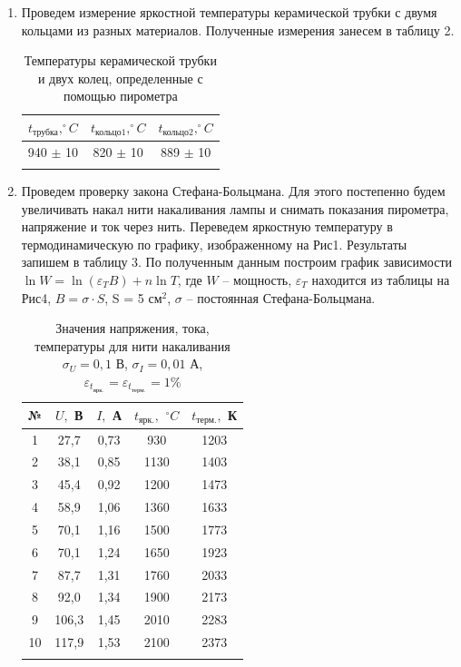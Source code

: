 \documentclass[a4paper, 12pt]{article}%
\begin{document}
\begin{enumerate}
		
		\newpage
		
		\item Проведем измерение яркостной температуры керамической трубки с двумя кольцами из разных материалов. Полученные измерения занесем в таблицу 2.
		
		\begin{longtable}{|c|c|c|}
			\hline
			$t_{\text{трубка}}, ^\circ C$ & $t_{\text{кольцо}1}, ^\circ C$ &  $t_{\text{кольцо}2}, ^\circ C$ \\ \hline
			940 $\pm$ 10 & 820 $\pm$ 10 & 889 $\pm$ 10 \\ \hline
			\caption{Температуры керамической трубки и двух колец, определенные с помощью пирометра}
		\end{longtable}
		
		
		\item Проведем проверку закона Стефана-Больцмана. Для этого постепенно будем увеличивать накал нити накаливания лампы и снимать показания пирометра, напряжение и ток через нить. Переведем яркостную температуру в термодинамическую по графику, изображенному на Рис1. Результаты запишем в таблицу 3. По полученным данным построим график зависимости $\ln W = \ln(\varepsilon_T B) + n\ln T$, где $W$ -- мощность, $\varepsilon_T$ находится из таблицы на Рис4, $B = \sigma \cdot S$, S = 5 см$^2$, $\sigma$ -- постоянная Стефана-Больцмана. 
		
 
		\begin{longtable}{|c|c|c|c|c|}
			\hline
			№ & $U,$ В & $I,$ А & $t_{\text{ярк.}},$ $ ^\circ C$ & $t_{\text{терм.}},$ К\\ \hline
			1 & 27,7 & 0,73 & 930 & 1203 \\\hline
			2 & 38,1 & 0,85 & 1130 & 1403 \\\hline
			3 & 45,4 & 0,92 & 1200 & 1473\\\hline
			4 & 58,9 & 1,06 & 1360 & 1633\\\hline
			5 & 70,1 & 1,16 & 1500 & 1773\\\hline
			6 & 70,1 & 1,24 & 1650 & 1923\\\hline
			7 & 87,7 & 1,31 & 1760 & 2033\\\hline
			8 & 92,0 & 1,34 & 1900 & 2173\\\hline
			9 & 106,3 & 1,45 & 2010 & 2283\\\hline
			10 & 117,9 & 1,53 & 2100 & 2373\\\hline
			\caption{Значения напряжения, тока, температуры для нити накаливания $\sigma_U = 0,1$ В, $\sigma_I = 0,01$ А, $\varepsilon_{t_{\text{ярк.}}} = \varepsilon_{t_{\text{терм.}}} = 1\%$}
		\end{longtable}
		

\end{enumerate}
\end{document}
